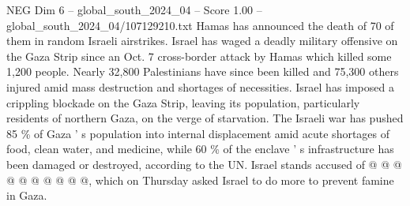 \begin{textsample}{NEG Dim 6 – global\_south\_2024\_04 – Score 1.00 – global\_south\_2024\_04/107129210.txt}
Hamas has announced the death of 70 of them in random Israeli airstrikes.
Israel has waged a deadly military offensive on the Gaza Strip since an Oct. 7 cross-border attack by Hamas which killed some 1,200 people.
Nearly 32,800 Palestinians have since been killed and 75,300 others injured amid mass destruction and shortages of necessities.
Israel has imposed a crippling blockade on the Gaza Strip, leaving its population, particularly residents of northern Gaza, on the verge of starvation.
The Israeli war has pushed 85 \% of Gaza ' s population into internal displacement amid acute shortages of food, clean water, and medicine, while 60 \% of the enclave ' s infrastructure has been damaged or destroyed, according to the UN.
Israel stands accused of @ @ @ @ @ @ @ @ @ @, which on Thursday asked Israel to do more to prevent famine in Gaza.

\end{textsample}
